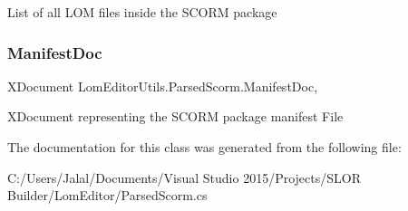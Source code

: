 List of all L\+OM files inside the S\+C\+O\+RM package 

\hypertarget{class_lom_editor_utils_1_1_parsed_scorm_af394da121e9b9e82adb87fa2dc6f2119}{}\label{class_lom_editor_utils_1_1_parsed_scorm_af394da121e9b9e82adb87fa2dc6f2119} 
\subsubsection{\texorpdfstring{Manifest\+Doc}{ManifestDoc}}
{\footnotesize\ttfamily X\+Document Lom\+Editor\+Utils.\+Parsed\+Scorm.\+Manifest\+Doc\hspace{0.3cm}{\ttfamily [get]}, {\ttfamily [set]}}



X\+Document representing the S\+C\+O\+RM package manifest File 



The documentation for this class was generated from the following file\+:\begin{DoxyCompactItemize}
\item 
C\+:/\+Users/\+Jalal/\+Documents/\+Visual Studio 2015/\+Projects/\+S\+L\+O\+R Builder/\+Lom\+Editor/Parsed\+Scorm.\+cs\end{DoxyCompactItemize}

